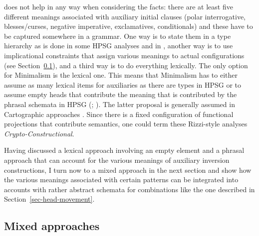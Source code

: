 \documentclass[output=paper,biblatex,babelshorthands,newtxmath,draftmode,colorlinks,citecolor=brown]{langscibook}
\begin{document}
does not help in any way when considering the facts: there are at least five different meanings
associated with auxiliary initial clauses (polar interrogative, blesses/curses, negative imperative,
exclamatives, conditionals) and these have to be captured somewhere in a grammar. One
way is to state them in a type hierarchy as is done in some HPSG analyses and in \sbcg, another way
is to use implicational constraints that assign various meanings to actual configurations
(see Section~\ref{sec-mixed-approaches}), and a third way is to do everything lexically. The only option for
Minimalism is the lexical one. This means that Minimalism has to either assume as many lexical items
for auxiliaries as there are types in HPSG or to assume empty heads that contribute the meaning that
is contributed by the phrasal schemata in HPSG (\citealp[Section~5]{Borsley2006a}; ). 
The latter proposal is generally assumed in
Cartographic approaches \citep{Rizzi97a-u}. Since there is a fixed configuration of functional projections
that contribute semantics, one could term these Rizzi-style analyses \emph{Crypto-Constructional}.

Having discussed a lexical approach involving an empty element and a phrasal approach that can
account for the various meanings of auxiliary inversion constructions, I turn now to a mixed
approach in the next section and show how the various meanings associated with certain patterns can
be integrated into accounts with rather abstract schemata for combinations like the one described in
Section~\ref{sec-head-movement}.

\subsection{Mixed approaches}
\label{sec-mixed-approaches}
\end{document}
